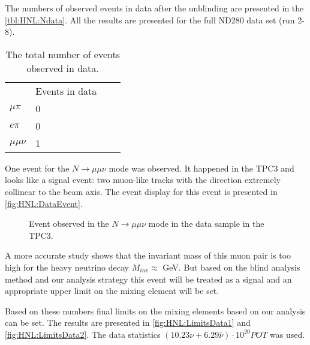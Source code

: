 \documentclass[../main.tex]{subfiles}
\begin{document}
The numbers of observed events in data after the unblinding are presented in the \autoref{tbl:HNL:Ndata}. All the results are presented for the full ND280 data set (run 2-8).

\begin{table}[!ht]
\begin{center}
\begin{tabular}{llll}
                            & Events in data      \\
  $\mu\pi$ \hspace{0.5cm}   & 0  \hspace{2cm}     \\
  $e\pi$                    & 0                   \\
  $\mu\mu\nu$               & 1                   \\
\end{tabular}
\caption{The total number of events observed in data.}
\label{tbl:HNL:Ndata}
\end{center}
\end{table}

One event for the $N\to\mu\mu\nu$ mode was observed. It happened in the TPC3 and looks like a signal event: two muon-like tracks with the direction extremely collinear to the beam axis. The event display for this event is presented in \autoref{fig:HNL:DataEvent}.

\begin{figure}[!ht]
    \begin{center}
  \begin{minipage}{0.49\linewidth}
  \end{minipage}
  \begin{minipage}{0.49\linewidth}
  \end{minipage}
  \caption{Event observed in the $N\to\mu\mu\nu$ mode in the data sample in the TPC3.}
  \label{fig:HNL:DataEvent}
  \end{center}
\end{figure}

A more accurate study shows that the invariant mass of this muon pair is too high for the heavy neutrino decay $M_{inv}\approx$ GeV. But based on the blind analysis method and our analysis strategy this event will be treated as a signal and an appropriate upper limit on the mixing element will be set.

Based on these numbers final limits on the mixing elements based on our analysis can be set. The results are presented in \autoref{fig:HNL:LimitsData1} and \autoref{fig:HNL:LimitsData2}. The data statistics $\left(10.23\nu+6.29\bar{\nu}\right)\cdot 10^{20}POT$ was used.
\end{document}
